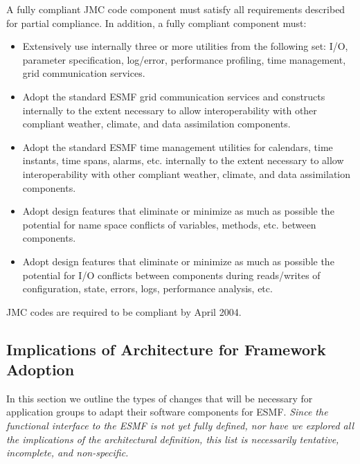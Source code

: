 A fully compliant JMC code component must satisfy all requirements 
described for partial compliance.  In addition, a fully compliant 
component must:

\begin{itemize}
\item Extensively use internally three or more utilities from the following
set:
   I/O, parameter specification, log/error, performance profiling, time
   management, grid communication services.

\item Adopt the standard ESMF grid communication services and constructs
   internally to the extent necessary to allow interoperability with
   other compliant weather, climate, and data assimilation
   components.

\item Adopt the standard ESMF time management utilities for calendars,
time instants, time spans, alarms, etc. internally to the extent
necessary to allow interoperability with other compliant weather,
climate, and data assimilation components.

\item Adopt design features that eliminate or minimize as much as possible
the potential for name space conflicts of variables, methods, etc.
between components.

\item Adopt design features that eliminate or minimize as much as possible
the potential for I/O conflicts between components during reads/writes
of configuration, state, errors, logs, performance analysis, etc.
\end{itemize}

JMC codes are required to be compliant by April 2004.

\subsection{Implications of Architecture for Framework Adoption}

In this section we outline the types of changes that will be necessary for
application groups to adapt their software components for ESMF.  {\it Since the
functional interface to the ESMF is not yet fully defined, nor have we 
explored all the implications of the architectural definition, this list is 
necessarily tentative, incomplete, and non-specific.}

